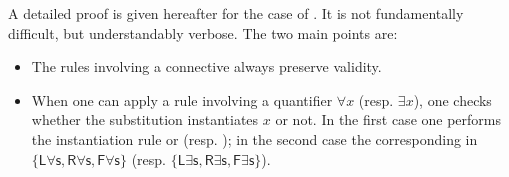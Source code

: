 A detailed proof is given hereafter for the case of . It is not
fundamentally difficult, but understandably verbose. The two main points are:
\begin{itemize}
\item The rules involving a connective always preserve validity.
\item When one can apply a rule involving a quantifier $\forall x$ (resp.
  $\exists x$), one checks whether the substitution instantiates $x$ or not. In
  the first case one performs the instantiation rule  or
   (resp. ); in the second case the
  corresponding  in {\small $\{\mathsf{L\forall s}, \mathsf{R\forall
  s}, \mathsf{F\forall s}\}$} (resp. {\small $\{\mathsf{L\exists s},
  \mathsf{R\exists s}, \mathsf{F\exists s}\}$}).
\end{itemize}
